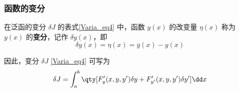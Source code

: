 \subsubsection{函数的变分}
在泛函的变分 $\delta J$ 的表式\autoref{Varia_eq4} 中，函数 $y(x)$ 的改变量 $\eta(x)$ 称为 $y(x)$ 的\textbf{变分}，记作 $\delta y(x)$，即
\begin{equation}\label{Varia_eq6}
\delta y(x)=\eta(x)=\overline{y}(x)-y(x)
\end{equation}

因此，变分 $\delta J$ \autoref{Varia_eq4} 可写为
\begin{equation}\label{Varia_eq5}
\delta J=\int_a^b\qty[F'_y(x,y,y')\delta y+F'_{y'}(x,y,y')\delta y']\dd x
\end{equation}
